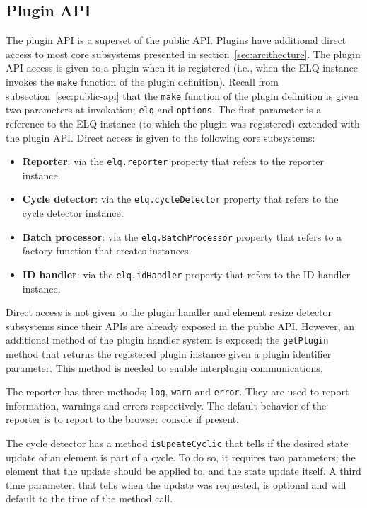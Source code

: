 \documentclass[a4paper,11pt]{kth-mag}
\newcommand{\code}[1]{\texttt{#1}}
\newcommand\abbr[2][]{\uppercase{#2}\ifthenelse{\equal{#1}{}}%
                     {}{#1}}
\begin{document}
      \subsection{Plugin API}
        The plugin \gls{API} is a superset of the public \gls{API}.
        Plugins have additional direct access to most core subsystems presented in section~\ref{sec:arcithecture}.
        The plugin \gls{API} access is given to a plugin when it is registered (i.e., when the \abbr{elq} instance invokes the \code{make} function of the plugin definition).
        Recall from subsection~\ref{sec:public-api} that the \code{make} function of the plugin definition is given two parameters at invokation; \code{elq} and \code{options}.
        The first parameter is a reference to the \abbr{ELQ} instance (to which the plugin was registered) extended with the plugin \gls{API}.
        Direct access is given to the following core subsystems:
        \begin{itemize}
          \item \textbf{Reporter}: via the \code{elq.reporter} property that refers to the reporter instance.
          \item \textbf{Cycle detector}: via the \code{elq.cycleDetector} property that refers to the cycle detector instance.
          \item \textbf{Batch processor}: via the \code{elq.BatchProcessor} property that refers to a factory function that creates  instances.
          \item \textbf{\abbr{ID} handler}: via the \code{elq.idHandler} property that refers to the \abbr{ID} handler instance. 
        \end{itemize}
        Direct access is not given to the plugin handler and element resize detector subsystems since their \glspl{API} are already exposed in the public \gls{API}.
        However, an additional method of the plugin handler system is exposed; the \code{getPlugin} method that returns the registered plugin instance given a plugin identifier parameter.
        This method is needed to enable interplugin communications.

        The reporter has three methods; \code{log}, \code{warn} and \code{error}.
        They are used to report information, warnings and errors respectively.
        The default behavior of the reporter is to report to the browser console if present.

        The cycle detector has a method \code{isUpdateCyclic} that tells if the desired state update of an element is part of a cycle.
        To do so, it requires two parameters; the element that the update should be applied to, and the state update itself.
        A third time parameter, that tells when the update was requested, is optional and will default to the time of the method call.
\end{document}
